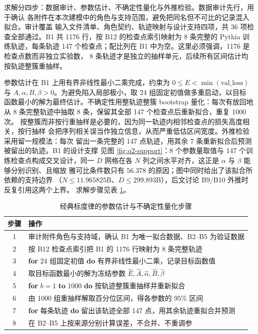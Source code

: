 \documentclass[bwprint]{gmcmthesis}
\numberwithin{equation}{section}
\numberwithin{figure}{section}
\numberwithin{table}{section}
\begin{document}
求解分四步：数据审计、参数估计、不确定性量化与外推检验。数据审计先行，用于确认
各附件在本次建模中的角色与支持范围，避免把同名但不可比的记录混入拟合。审计覆盖
输入文件清单、角色契约、轨迹映射与设计支持四项，共 36 项检查全部通过。B1 共
1176 行，按 B12 的检查点索引映射为 8 条完整的 Pythia 训练轨迹，每条轨迹
147 个检查点；配比列在 B1 中为空。这里必须强调，1176 是检查点数而非独立实验数，
8 条轨迹才是独立的抽样单元，后续所有区间估计均按轨迹整簇重抽样。

参数估计在 B1 上用有界非线性最小二乘完成，约束为 $0\le E<\min(\mathrm{val\_loss})$
与 $A,\alpha,B,\beta>0$。为避免陷入局部极小，取 24 组固定初值做多重启动，以目标
函数最小的解为最终估计。不确定性用整轨迹整簇 bootstrap 量化：每次有放回地
从 8 条完整轨迹中抽取 8 条，保留其全部 147 个检查点后重新拟合，重复 1000 次。
按整簇而非按行重抽样是必要的，因为同一轨迹内相邻检查点的损失高度相关，按行抽样
会把序列相关误当作独立信息，从而严重低估区间宽度。外推检验采用留一规模法：每次
留出一条完整的 147 点轨迹，用其余 7 条重新拟合后预测被留出的轨迹。B1 的设计支撑
见图 \ref{fig:q2-support}：8 个参数量取值与 147 个训练检查点构成交叉设计，同一
$D$ 网格在各 $N$ 列之间水平对齐，这正是 $\alpha$ 与 $\beta$ 能够分别识别、且缩放
雅可比条件数只有 $56.378$ 的原因；图中同时给出了该拟合所依赖的支持边界
（$N\le11.965825$B、$D\le299.893$B），后文讨论 B9/B10 外推时反复引用这两个上界。
求解步骤见表 \ref{alg:q2-solve}。

\begin{table}[htp!]
\centering
\renewcommand\arraystretch{1.2}
\caption{经典标度律的参数估计与不确定性量化步骤}\label{alg:q2-solve}
\begin{tabularx}{\textwidth}{cX}
\toprule
步骤 & 操作 \\
\midrule
1 & 审计附件角色与支持域，确认 B1 为唯一拟合数据、B2--B5 为验证数据 \\
2 & 按 B12 检查点索引把 B1 的 1176 行映射为 8 条完整轨迹 \\
3 & \textbf{for} 24 组固定初值 \textbf{do} 有界非线性最小二乘，记录目标函数值 \\
4 & 取目标函数最小的解为冻结参数 $\hat E,\hat A,\hat\alpha,\hat B,\hat\beta$ \\
5 & \textbf{for} $b=1$ \textbf{to} 1000 \textbf{do} 按轨迹整簇重抽样并重新拟合 \\
6 & 由 1000 组重抽样解取百分位区间，得各参数的 $95\%$ 区间 \\
7 & \textbf{for} 每条轨迹 \textbf{do} 留出该轨迹全部 147 点，用其余轨迹重拟合并预测 \\
8 & 在 B2--B5 上按来源分别计算误差，不合并、不重调参 \\
\bottomrule
\end{tabularx}
\end{table}
\end{document}
